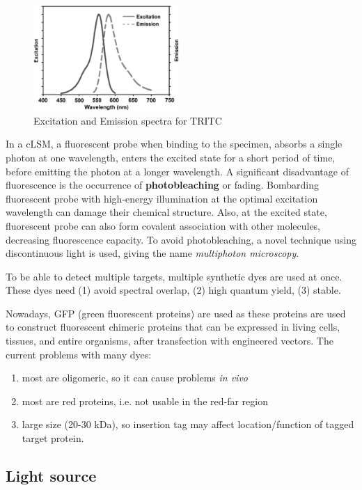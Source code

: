 \begin{figure}[hbt]
  \centerline{\includegraphics[height=4cm,
    angle=0]{./images/excite_emit_TRITC.eps}}
  \caption{Excitation and Emission spectra for TRITC}
\label{fig:emit-excite_TRITC}
\end{figure}

In a cLSM, a fluorescent probe when binding to the specimen, absorbs a single
photon at one wavelength, enters the excited state for a short period of time,
before emitting the photon at a longer wavelength. A significant disadvantage of
fluorescence is the occurrence of {\bf photobleaching} or fading. Bombarding
fluorescent probe with high-energy illumination at the optimal excitation
wavelength can damage their chemical structure. Also, at the excited state,
fluorescent probe can also form covalent association with other molecules,
decreasing fluorescence capacity. To avoid photobleaching, a novel technique
using discontinuous light is used, giving the name {\it multiphoton microscopy}.

To be able to detect multiple targets, multiple synthetic dyes are used at once.
These dyes need (1) avoid spectral overlap, (2) high quantum yield, (3) stable. 

Nowadays, GFP (green fluorescent proteins) are used as these proteins are used
to construct fluorescent chimeric proteins that can be expressed in living
cells, tissues, and entire organisms, after transfection with engineered
vectors. The current problems with many dyes:
\begin{enumerate}
  \item most are oligomeric, so it can cause problems {\it in vivo}
  \item most are red proteins, i.e. not usable in the red-far region
  \item large size (20-30 kDa), so insertion tag may affect location/function of
  tagged target protein.
\end{enumerate}


\subsection{Light source}
\label{sec:light_source}


